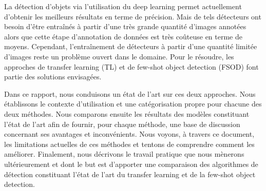 
La détection d'objets via l'utilisation du deep learning permet actuellement d'obtenir les meilleurs résultats en terme de précision. Mais de tels détecteurs ont besoin d'être entraînés à partir d'une très grande quantité d'images annotées alors que cette étape d'annotation de données est très coûteuse en terme de moyens. Cependant, l'entraînement de détecteurs à partir d'une quantité limitée d'images reste un problème ouvert dans le domaine. Pour le résoudre, les approches de transfer learning (TL) et de few-shot object detection (FSOD) font partie des solutions envisagées. 

Dans ce rapport, nous conduisons un état de l'art sur ces deux approches. Nous établissons le contexte d'utilisation et une catégorisation propre pour chacune des deux méthodes. Nous comparons ensuite les résultats des modèles constituant l'état de l'art afin de fournir, pour chaque méthode, une base de discussion concernant ses avantages et inconvénients. Nous voyons, à travers ce document, les limitations actuelles de ces méthodes et tentons de comprendre comment les améliorer. Finalement, nous décrivons le travail pratique que nous mènerons ultérieurement et dont le but est d'apporter une comparaison des algorithmes de détection constituant l'état de l'art du transfer learning et de la few-shot object detection.